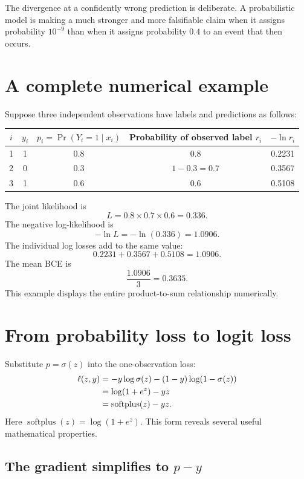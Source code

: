 \documentclass[11pt]{article}
\newcommand{\rowrule}{\specialrule{0.20pt}{1.25pt}{1.25pt}}
\newcommand{\sigmoid}{\sigma}
\newcommand{\softplus}{\operatorname{softplus}}
\theoremstyle{definition}
\begin{document}
The divergence at a confidently wrong prediction is deliberate. A probabilistic model is making a much stronger and more falsifiable claim when it assigns probability $10^{-9}$ than when it assigns probability $0.4$ to an event that then occurs.

\section{A complete numerical example}

Suppose three independent observations have labels and predictions as follows:

\begin{center}
\begin{tabular}{ccccc}
\toprule
$i$ & $y_i$ & $p_i=\Pr(Y_i=1\mid x_i)$ & Probability of observed label $r_i$ & $-\ln r_i$ \\
\midrule
1 & 1 & 0.8 & 0.8 & 0.2231 \\
\rowrule
2 & 0 & 0.3 & $1-0.3=0.7$ & 0.3567 \\
\rowrule
3 & 1 & 0.6 & 0.6 & 0.5108 \\
\bottomrule
\end{tabular}
\end{center}

The joint likelihood is
\[
L=0.8\times0.7\times0.6=0.336.
\]
The negative log-likelihood is
\[
-\ln L=-\ln(0.336)=1.0906.
\]
The individual log losses add to the same value:
\[
0.2231+0.3567+0.5108=1.0906.
\]
The mean BCE is
\[
\frac{1.0906}{3}=0.3635.
\]
This example displays the entire product-to-sum relationship numerically.

\section{From probability loss to logit loss}

Substitute $p=\sigmoid(z)$ into the one-observation loss:
\begin{align}
\ell(z,y)
&=-y\log\sigmoid(z)-(1-y)\log(1-\sigmoid(z))\notag\\
&=\log(1+e^z)-yz\notag\\
&=\softplus(z)-yz.
\label{eq:softplus-loss}
\end{align}
Here $\softplus(z)=\log(1+e^z)$. This form reveals several useful mathematical properties.

\subsection{The gradient simplifies to \texorpdfstring{$p-y$}{p-y}}
\end{document}
